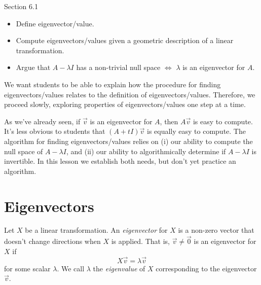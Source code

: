 \documentclass{problemset}
\begin{document}
\begin{lesson}

	Section 6.1

	\begin{itemize}
		\item Define eigenvector/value.
		\item Compute eigenvectors/values given a geometric description of a linear transformation.
		\item Argue that $A-\lambda I$ has a non-trivial null space $\iff$ $\lambda$ is an eigenvector for $A$.
	\end{itemize}

	We want students to be able to explain how the procedure for finding eigenvectors/values
	relates to the definition of eigenvectors/values. Therefore, we proceed slowly, exploring
	properties of eigenvectors/values one step at a time.

	As we've already seen, if $\vec v$ is an eigenvector for $A$, then $A\vec v$ is easy to compute.
	It's less obvious to students that $(A+tI)\vec v$ is equally easy to compute. 
	The algorithm for
	finding eigenvectors/values relies on (i) our ability to compute the null space of $A-\lambda I$,
	and (ii) our ability to algorithmically determine if $A-\lambda I$ is invertible. In this lesson we
	establish both needs, but don't yet practice an algorithm.


\end{lesson}
\section*{Eigenvectors}

	\vspace{-.6cm}
	\begin{definition}[Eigenvector]
	Let $X$ be a linear transformation.  An \emph{eigenvector} for $X$ is a non-zero vector that doesn't
	change directions when $X$ is applied.  That is, $\vec v\neq \vec 0$ is an eigenvector for $X$ if
	\[
		X\vec v=\lambda \vec v
	\]
	for some scalar $\lambda$.  We call $\lambda$ the \emph{eigenvalue}
	of $X$ corresponding
	to the eigenvector $\vec v$.
	\end{definition}
	\vspace{-.2cm}
\end{document}
